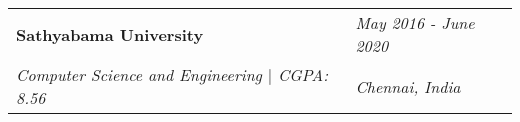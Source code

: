 \newcommand{\educationItem}[4]{
    \begin{tabularx}{\textwidth}{lX}
        \textbf{#1} & \hfill\textit{#2} \\ %
        \textit{#3} & \hfill\textit{#4} \\ %
    \end{tabularx}
}

\section{}

\educationItem{Sathyabama University}{May 2016 - June 2020}{Computer Science and Engineering $|$ CGPA: 8.56}{Chennai, India}
